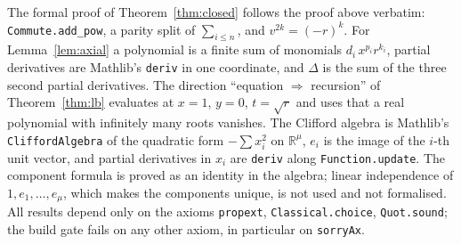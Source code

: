 \documentclass[11pt,a4paper]{article}
\newcommand{\R}{\mathbb{R}}
\newcommand{\lean}[1]{\texttt{#1}}
\theoremstyle{remark}
\begin{document}
The formal proof of Theorem~\ref{thm:closed} follows the proof above verbatim:
\lean{Commute.add\_pow}, a parity split of $\sum_{i\le n}$, and $v^{2k}=(-r)^k$.
For Lemma~\ref{lem:axial} a polynomial is a finite sum of monomials $d_i\,x^{p_i}r^{k_i}$,
partial derivatives are Mathlib's \lean{deriv} in one coordinate, and
$\Delta$ is the sum of the three second partial derivatives. The direction
``equation $\Rightarrow$ recursion'' of Theorem~\ref{thm:lb} evaluates at $x=1$, $y=0$,
$t=\sqrt r$ and uses that a real polynomial with infinitely many roots vanishes.
The Clifford algebra is Mathlib's \lean{CliffordAlgebra} of the quadratic form
$-\sum x_i^2$ on $\R^\mu$, $e_i$ is the image of the $i$-th unit vector, and
partial derivatives in $x_i$ are \lean{deriv} along \lean{Function.update}. The component
formula is proved as an identity in the algebra; linear independence of $1,e_1,\dots,e_\mu$,
which makes the components unique, is not used and not formalised.
All results depend only on the axioms \lean{propext}, \lean{Classical.choice},
\lean{Quot.sound}; the build gate fails on any other axiom, in particular on \lean{sorryAx}.
\end{document}
